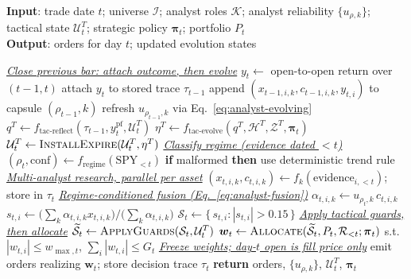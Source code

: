 \documentclass[letterpaper]{article}
\newcommand{\PHASE}[1]{\STATE \textit{\underline{#1}}}
\begin{document}
\begin{algorithm}[tb]
\caption{DarwinTrade per-bar decision and delayed feedback}
\label{alg:perbar}
\textbf{Input}: trade date $t$; universe $\mathcal{I}$; analyst roles $\mathcal{K}$;
analyst reliability $\{u_{\rho,k}\}$; tactical state $\mathcal{U}^T_t$; strategic
policy $\boldsymbol{\pi}_t$; portfolio $P_t$\\
\textbf{Output}: orders for day $t$; updated evolution states
\begin{algorithmic}[1]
\PHASE{Close previous bar: attach outcome, then evolve}
  \STATE $y_t \leftarrow$ open-to-open return over $(t{-}1,t)$ 
  \STATE attach $y_t$ to stored trace $\tau_{t-1}$
  \STATE append $(x_{t-1,i,k},c_{t-1,i,k},y_{t,i})$ to capsule $(\rho_{t-1},k)$
  \STATE refresh $u_{\rho_{t-1},k}$ via Eq.~\ref{eq:analyst-evolving}
  \STATE $q^T \leftarrow f_{\text{tac-reflect}}(\tau_{t-1}, y^{\mathrm{pf}}_t, \mathcal{U}^T_t)$
  \STATE $\eta^T \leftarrow f_{\text{tac-evolve}}(q^T,\mathcal{H}^T,\mathcal{Z}^T,\boldsymbol{\pi}_t)$
  \STATE $\mathcal{U}^T_t \leftarrow \textsc{InstallExpire}(\mathcal{U}^T_t, \eta^T)$ 
\ENDIF
\PHASE{Classify regime (evidence dated ${<}t$)}
\STATE $(\rho_t,\text{conf}) \leftarrow f_{\text{regime}}(\text{SPY}_{<t})$
\STATE \textbf{if} malformed \textbf{then} use deterministic trend rule
\PHASE{Multi-analyst research, parallel per asset}
  \STATE $(x_{t,i,k}, c_{t,i,k}) \leftarrow f_k(\text{evidence}_{i,<t})$; store in $\tau_t$
\ENDFOR
\PHASE{Regime-conditioned fusion (Eq.~\ref{eq:analyst-fusion})}
  \STATE $\alpha_{t,i,k} \leftarrow u_{\rho_t,k}\,c_{t,i,k}$
  \STATE $s_{t,i} \leftarrow \big(\textstyle\sum_k \alpha_{t,i,k}x_{t,i,k}\big)/\big(\textstyle\sum_k \alpha_{t,i,k}\big)$
\ENDFOR
\STATE $\mathcal{S}_t \leftarrow \{\,s_{t,i}: |s_{t,i}|>0.15\,\}$ 
\PHASE{Apply tactical guards, then allocate}
\STATE $\widetilde{\mathcal{S}}_t \leftarrow \textsc{ApplyGuards}(\mathcal{S}_t, \mathcal{U}^T_t)$
\STATE $\boldsymbol{w}_t \leftarrow \textsc{Allocate}(\widetilde{\mathcal{S}}_t, P_t, \mathcal{R}_{<t}; \boldsymbol{\pi}_t)$
\STATE \quad s.t. $|w_{t,i}|\le w_{\max,t}$, $\sum_i|w_{t,i}|\le G_t$
\PHASE{Freeze weights; day-$t$ open is fill price only}
\STATE emit orders realizing $\boldsymbol{w}_t$; store decision trace $\tau_t$
\STATE \textbf{return} orders, $\{u_{\rho,k}\}$, $\mathcal{U}^T_t$, $\boldsymbol{\pi}_t$
\end{algorithmic}
\end{algorithm}
\end{document}
